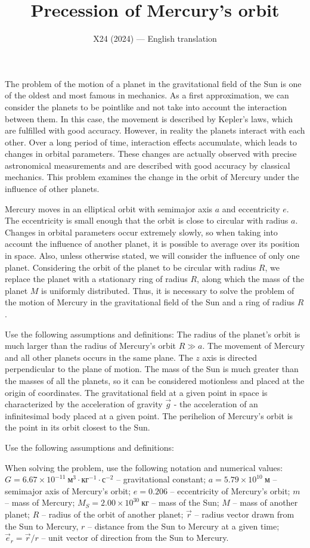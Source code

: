 \documentclass[11pt,a4paper]{article}
\title{\textbf{Precession of Mercury's orbit}}
\author{\normalsize X24 (2024) --- English translation}
\date{}
\begin{document}
\maketitle

The problem of the motion of a planet in the gravitational field of the Sun is one of the oldest and most famous in mechanics. As a first approximation, we can consider the planets to be pointlike and not take into account the interaction between them. In this case, the movement is described by Kepler's laws, which are fulfilled with good accuracy. However, in reality the planets interact with each other. Over a long period of time, interaction effects accumulate, which leads to changes in orbital parameters. These changes are actually observed with precise astronomical measurements and are described with good accuracy by classical mechanics. This problem examines the change in the orbit of Mercury under the influence of other planets.

Mercury moves in an elliptical orbit with semimajor axis $a$ and eccentricity $e$. The eccentricity is small enough that the orbit is close to circular with radius $a$. Changes in orbital parameters occur extremely slowly, so when taking into account the influence of another planet, it is possible to average over its position in space. Also, unless otherwise stated, we will consider the influence of only one planet. Considering the orbit of the planet to be circular with radius $R$, we replace the planet with a stationary ring of radius $R$, along which the mass of the planet $M$ is uniformly distributed.  Thus, it is necessary to solve the problem of the motion of Mercury in the gravitational field of the Sun and a ring of radius $R$.

Use the following assumptions and definitions: The radius of the planet's orbit is much larger than the radius of Mercury's orbit $R \gg a$. The movement of Mercury and all other planets occurs in the same plane. The $z$ axis is directed perpendicular to the plane of motion. The mass of the Sun is much greater than the masses of all the planets, so it can be considered motionless and placed at the origin of coordinates. The gravitational field at a given point in space is characterized by the acceleration of gravity $\vec{g}$ - the acceleration of an infinitesimal body placed at a given point. The perihelion of Mercury's orbit is the point in its orbit closest to the Sun.

Use the following assumptions and definitions:

When solving the problem, use the following notation and numerical values: $G = 6.67 \times 10^{-11}~\text{м}^3 \cdot \text{кг}^{-1} \cdot\text{с}^{-2}$ – gravitational constant; $a = 5.79 \times 10^{10}~\text{м}$ – semimajor axis of Mercury’s orbit; $e = 0.206$ – eccentricity of Mercury’s orbit; $m$ – mass of Mercury; $M_S = 2.00 \times 10^{30}~\text{кг}$ – mass of the Sun; $M$ – mass of another planet; $R$ – radius of the orbit of another planet; $\vec{r}$ – radius vector drawn from the Sun to Mercury, $r$ – distance from the Sun to Mercury at a given time; $\vec{e}_r = \vec{r}/r$ – unit vector of direction from the Sun to Mercury.
\end{document}
